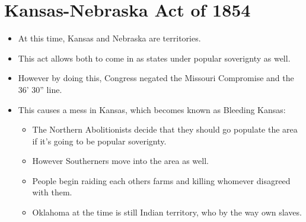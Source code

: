 \documentclass{article}
\begin{document}
\section{Kansas-Nebraska Act of 1854}
  \begin{itemize}
    \item At this time, Kansas and Nebraska are territories.
    \item This act allows both to come in as states under popular soverignty as well.
    \item However by doing this, Congress negated the Missouri Compromise and the 36' 30'' line.
    \item This causes a mess in Kansas, which becomes known as Bleeding Kansas:
      \begin{itemize}
        \item The Northern Abolitionists decide that they should go populate the area if it's going to be popular soverignty.
        \item However Southerners move into the area as well.
        \item People begin raiding each others farms and killing whomever disagreed with them.
        \item Oklahoma at the time is still Indian territory, who by the way own slaves.
      \end{itemize}
  \end{itemize}
\end{document}
